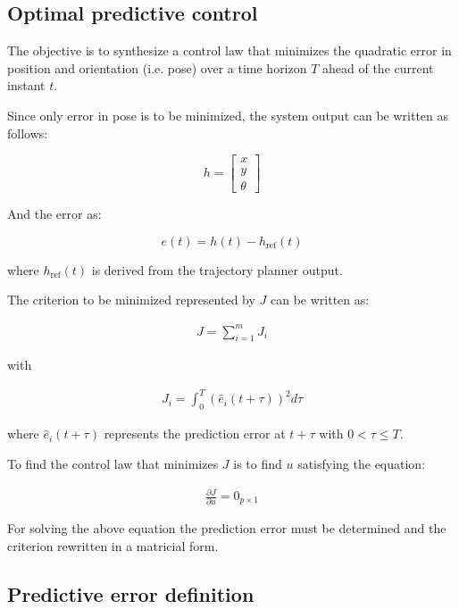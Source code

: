 \documentclass[letterpaper, 10 pt, conference]{ieeeconf}  %
\begin{document}
\subsection{Optimal predictive control}

The objective is to synthesize a control law that minimizes the quadratic error in position and orientation (i.e. pose) over a time horizon $T$ ahead of the current instant $t$.

Since only error in pose is to be minimized, the system output can be written as follows:

\[
h = \left[\begin{array}{c}
x\\
y\\
\theta
\end{array}
\right]
\]

And the error as:

\[
	e(t) =  h(t) - h_{\text{ref}}(t)
\]

where $h_{\text{ref}}(t)$ is derived from the trajectory planner output.

The criterion to be minimized represented by $J$ can be written as:

\begin{align*}
J = \sum_{i=1}^m J_i 
\end{align*}

with

\begin{align*}
J_i = \int_0^{T} (\hat{e}_i(t+\tau))^2d\tau
\end{align*}

where $\hat{e}_i(t+\tau)$ represents the prediction error at $t+\tau$ with $0 < \tau \leq T$.

To find the control law that minimizes $J$ is to find $u$ satisfying the equation:

\begin{align*}
\frac{\partial J}{\partial u} = 0_{p\times 1}
\end{align*}

For solving the above equation the prediction error must be determined and the criterion rewritten in a matricial form.


\subsection{Predictive error definition}
\end{document}
